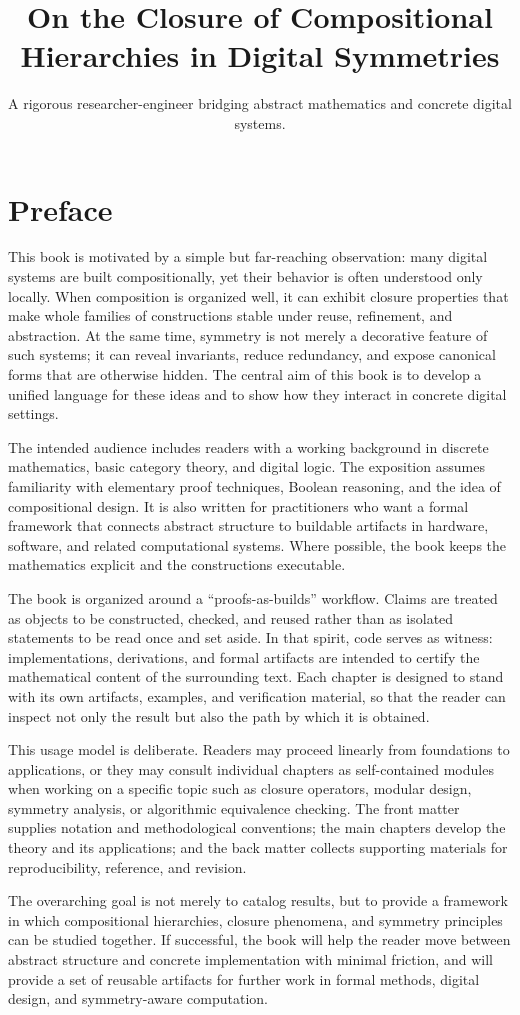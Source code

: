 \documentclass[11pt]{article}
\title{On the Closure of Compositional Hierarchies in Digital Symmetries}
\author{A rigorous researcher-engineer bridging abstract mathematics and concrete digital systems.}
\begin{document}
\section*{Preface}

This book is motivated by a simple but far-reaching observation: many digital systems are built compositionally, yet their behavior is often understood only locally. When composition is organized well, it can exhibit closure properties that make whole families of constructions stable under reuse, refinement, and abstraction. At the same time, symmetry is not merely a decorative feature of such systems; it can reveal invariants, reduce redundancy, and expose canonical forms that are otherwise hidden. The central aim of this book is to develop a unified language for these ideas and to show how they interact in concrete digital settings.

The intended audience includes readers with a working background in discrete mathematics, basic category theory, and digital logic. The exposition assumes familiarity with elementary proof techniques, Boolean reasoning, and the idea of compositional design. It is also written for practitioners who want a formal framework that connects abstract structure to buildable artifacts in hardware, software, and related computational systems. Where possible, the book keeps the mathematics explicit and the constructions executable.

The book is organized around a ``proofs-as-builds'' workflow. Claims are treated as objects to be constructed, checked, and reused rather than as isolated statements to be read once and set aside. In that spirit, code serves as witness: implementations, derivations, and formal artifacts are intended to certify the mathematical content of the surrounding text. Each chapter is designed to stand with its own artifacts, examples, and verification material, so that the reader can inspect not only the result but also the path by which it is obtained.

This usage model is deliberate. Readers may proceed linearly from foundations to applications, or they may consult individual chapters as self-contained modules when working on a specific topic such as closure operators, modular design, symmetry analysis, or algorithmic equivalence checking. The front matter supplies notation and methodological conventions; the main chapters develop the theory and its applications; and the back matter collects supporting materials for reproducibility, reference, and revision.

The overarching goal is not merely to catalog results, but to provide a framework in which compositional hierarchies, closure phenomena, and symmetry principles can be studied together. If successful, the book will help the reader move between abstract structure and concrete implementation with minimal friction, and will provide a set of reusable artifacts for further work in formal methods, digital design, and symmetry-aware computation.
\end{document}

